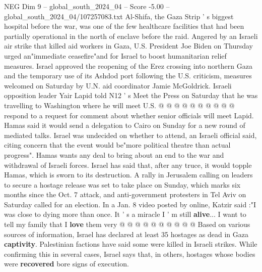 \begin{textsample}{NEG Dim 9 – global\_south\_2024\_04 – Score -5.00 – global\_south\_2024\_04/107257083.txt}
Al-Shifa, the Gaza Strip ' s biggest hospital before the war, was one of the few healthcare facilities that had been partially operational in the north of enclave before the raid.
Angered by an Israeli air strike that killed aid workers in Gaza, U.S.
President Joe Biden on Thursday urged an"immediate ceasefire"and for Israel to boost humanitarian relief measures.
Israel approved the reopening of the Erez crossing into northern Gaza and the temporary use of its Ashdod port following the U.S. criticism, measures welcomed on Saturday by U.N. aid coordinator Jamie McGoldrick.
Israeli opposition leader Yair Lapid told N12 ' s Meet the Press on Saturday that he was travelling to Washington where he will meet U.S. @ @ @ @ @ @ @ @ @ @ respond to a request for comment about whether senior officials will meet Lapid.
Hamas said it would send a delegation to Cairo on Sunday for a new round of mediated talks.
Israel was undecided on whether to attend, an Israeli official said, citing concern that the event would be"more political theatre than actual progress".
Hamas wants any deal to bring about an end to the war and withdrawal of Israeli forces.
Israel has said that, after any truce, it would topple Hamas, which is sworn to its destruction.
A rally in Jerusalem calling on leaders to secure a hostage release was set to take place on Sunday, which marks six months since the Oct. 7 attack, and anti-government protesters in Tel Aviv on Saturday called for an election.
In a Jan. 8 video posted by online, Katzir said :"I was close to dying more than once.
It ' s a miracle I ' m still \textbf{alive}...
I want to tell my family that I \textbf{love} them very @ @ @ @ @ @ @ @ @ @ Based on various sources of information, Israel has declared at least 35 hostages as dead in Gaza \textbf{captivity}.
Palestinian factions have said some were killed in Israeli strikes.
While confirming this in several cases, Israel says that, in others, hostages whose bodies were \textbf{recovered} bore signs of execution.

\end{textsample}
